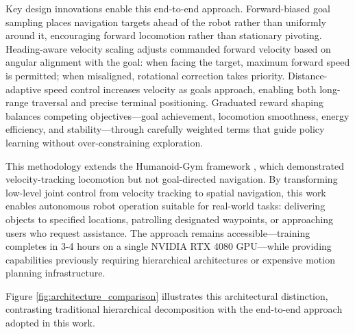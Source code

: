 \documentclass[12pt,a4paper]{article}
\begin{document}
Key design innovations enable this end-to-end approach. Forward-biased goal sampling places navigation targets ahead of the robot rather than uniformly around it, encouraging forward locomotion rather than stationary pivoting. Heading-aware velocity scaling adjusts commanded forward velocity based on angular alignment with the goal: when facing the target, maximum forward speed is permitted; when misaligned, rotational correction takes priority. Distance-adaptive speed control increases velocity as goals approach, enabling both long-range traversal and precise terminal positioning. Graduated reward shaping balances competing objectives—goal achievement, locomotion smoothness, energy efficiency, and stability—through carefully weighted terms that guide policy learning without over-constraining exploration.

This methodology extends the Humanoid-Gym framework \parencite{gu2024humanoidgym}, which demonstrated velocity-tracking locomotion but not goal-directed navigation. By transforming low-level joint control from velocity tracking to spatial navigation, this work enables autonomous robot operation suitable for real-world tasks: delivering objects to specified locations, patrolling designated waypoints, or approaching users who request assistance. The approach remains accessible—training completes in 3-4 hours on a single NVIDIA RTX 4080 GPU—while providing capabilities previously requiring hierarchical architectures or expensive motion planning infrastructure.

Figure \ref{fig:architecture_comparison} illustrates this architectural distinction, contrasting traditional hierarchical decomposition with the end-to-end approach adopted in this work.
\end{document}
